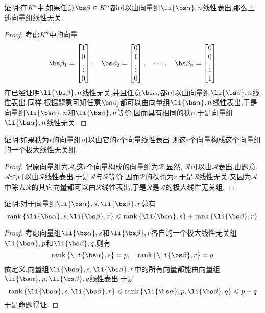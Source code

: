 \documentclass{ctexart}
\begin{document}
\begin{homework}[6]
    证明:在$K^n$中,如果任意$\bs\beta\in K^n$都可以由向量组$\li{\bs\alpha},n$线性表出,那么上述向量组线性无关.
\end{homework}
\begin{proof}
    考虑$K^n$中的向量
    \[\bs\beta_1=\begin{bmatrix}
        1\\0\\\vdots\\0
    \end{bmatrix},\quad\bs\beta_2=\begin{bmatrix}
        0\\1\\\vdots\\0
    \end{bmatrix},\quad\cdots,\quad\bs\beta_n=\begin{bmatrix}
        0\\0\\\vdots\\1
    \end{bmatrix}\]
    在已经证明$\li{\bs\beta},n$线性无关,并且任意$\bs\alpha_i$都可以由向量组$\li{\bs\beta},n$线性表出.同样,根据题意可知任意$\bs\beta_j$都可以由向量组$\li{\bs\alpha},n$线性表出,于是向量组$\li{\bs\alpha},n$和$\li{\bs\beta},n$等价,因而具有相同的秩$n$.于是向量组$\li{\bs\alpha},n$线性无关.
\end{proof}
\begin{homework}[7]
    证明:如果秩为$r$的向量组可以由它的$r$个向量线性表出,则这$r$个向量构成这个向量组的一个极大线性无关组.
\end{homework}
\begin{proof}
    记原向量组为$\mathcal{A}$,这$r$个向量构成的向量组为$\mathcal{R}$.显然, $\mathcal{R}$可以由$\mathcal{A}$表出.由题意, $\mathcal{A}$也可以由$\mathcal{R}$线性表出.于是$\mathcal{A}$与$\mathcal{R}$等价.因而$\mathcal{R}$的秩也为$r$,于是$\mathcal{R}$线性无关.又因为$\mathcal{A}$中除去$\mathcal{R}$的其它向量都可以由$\mathcal{R}$线性表出,于是$\mathcal{R}$是$\mathcal{A}$的极大线性无关组.
\end{proof}
\begin{homework}[9]
    证明:对于向量组$\li{\bs\alpha},s,\li{\bs\beta},r$总有
    \[\text{rank}\left\{\li{\bs\alpha},s,\li{\bs\beta},r\right\}\leqslant\text{rank}\left\{\li{\bs\alpha},s\right\}+\text{rank}\left\{\li{\bs\beta},r\right\}\]
\end{homework}
\begin{proof}
    考虑向量组$\li{\bs\alpha},s$和$\li{\bs\beta},r$各自的一个极大线性无关组$\li{\bs\alpha},p$和$\li{\bs\beta},q$,则有
    \[\text{rank}\left\{\li{\bs\alpha},s\right\}=p,\quad\text{rank}\left\{\li{\bs\beta},r\right\}=q\]
    依定义,向量组$\li{\bs\alpha},s,\li{\bs\beta},r$中的所有向量都能由向量组$\li{\bs\alpha},p,\li{\bs\beta},q$线性表出.于是
    \[\text{rank}\left\{\li{\bs\alpha},s,\li{\bs\beta},r\right\}\leqslant\text{rank}\left\{\li{\bs\alpha},p,\li{\bs\beta},q\right\}\leqslant p+q\]
    于是命题得证.
\end{proof}
\end{document}

